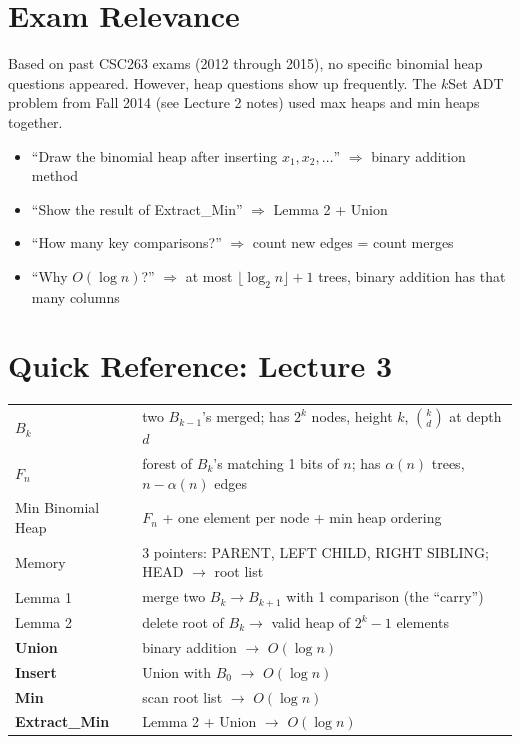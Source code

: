 \documentclass[11pt]{article}
\begin{document}
\section{Exam Relevance}

Based on past CSC263 exams (2012 through 2015), no specific binomial heap questions appeared. However, heap questions show up frequently. The $k$Set ADT problem from Fall 2014 (see Lecture 2 notes) used max heaps and min heaps together.

\begin{warnbox}
\begin{itemize}[leftmargin=1.4em,itemsep=2pt]
  \item ``Draw the binomial heap after inserting $x_1, x_2, \ldots$'' $\Rightarrow$ binary addition method
  \item ``Show the result of Extract\_Min'' $\Rightarrow$ Lemma 2 + Union
  \item ``How many key comparisons?'' $\Rightarrow$ count new edges = count merges
  \item ``Why $O(\log n)$?'' $\Rightarrow$ at most $\lfloor \log_2 n \rfloor + 1$ trees, binary addition has that many columns
\end{itemize}
\end{warnbox}

\section*{\textcolor{violetT}{Quick Reference: Lecture 3}}
\begin{keybox}
\renewcommand{\arraystretch}{1.4}
\begin{tabular}{l l}
$B_k$ & two $B_{k-1}$'s merged; has $2^k$ nodes, height $k$, $\binom{k}{d}$ at depth $d$\\
$F_n$ & forest of $B_k$'s matching 1 bits of $n$; has $\alpha(n)$ trees, $n{-}\alpha(n)$ edges\\
Min Binomial Heap & $F_n$ + one element per node + min heap ordering\\
Memory & 3 pointers: \textcolor{rustW}{PARENT}, \textcolor{greenO}{LEFT CHILD}, \textcolor{heapblue}{RIGHT SIBLING}; HEAD $\to$ root list\\
Lemma 1 & merge two $B_k \to B_{k+1}$ with 1 comparison (the ``carry'')\\
Lemma 2 & delete root of $B_k \to$ valid heap of $2^k{-}1$ elements\\
\textbf{Union} & binary addition $\to$ $O(\log n)$\\
\textbf{Insert} & Union with $B_0$ $\to$ $O(\log n)$\\
\textbf{Min} & scan root list $\to$ $O(\log n)$\\
\textbf{Extract\_Min} & Lemma 2 + Union $\to$ $O(\log n)$\\
\end{tabular}
\end{keybox}
\end{document}
